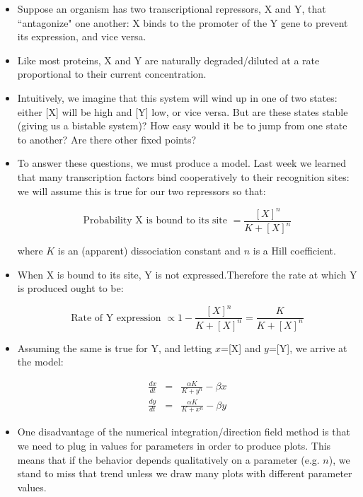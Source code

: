 \documentclass{article}
\begin{document}
\begin{itemize}

\item Suppose an organism has two transcriptional repressors, X and Y, that ``antagonize" one another: X binds to the promoter of the Y gene to prevent its expression, and vice versa.
\item Like most proteins, X and Y are naturally degraded/diluted at a rate proportional to their current concentration.
\item Intuitively, we imagine that this system will wind up in one of two states: either [X] will be high and [Y] low, or vice versa. But are these states stable (giving us a bistable system)? How easy would it be to jump from one state to another? Are there other fixed points?

\item To answer these questions, we must produce a model. Last week we learned that many transcription factors bind cooperatively to their recognition sites: we will assume this is true for our two repressors so that:

\[ \textrm{Probability X is bound to its site } = \frac{\left[ X \right]^{n}}{K + \left[ X \right]^{n}} \]

where $K$ is an (apparent) dissociation constant and $n$ is a Hill coefficient.

\item When X is bound to its site, Y is not expressed.Therefore the rate at which Y is produced ought to be:

\[ \textrm{Rate of Y expression } \propto 1 - \frac{\left[ X \right]^{n}}{K + \left[ X \right]^{n}} =  \frac{K}{K + \left[ X \right]^{n}}\]

\item Assuming the same is true for Y, and letting $x$=[X] and $y$=[Y], we arrive at the model:

\begin{eqnarray*}
\frac{dx}{dt} & = & \frac{\alpha K}{K + y^{n}} -  \beta x\\
\frac{dy}{dt} & = & \frac{\alpha K}{K + x^{n}} - \beta y
\end{eqnarray*}

\item One disadvantage of the numerical integration/direction field method is that we need to plug in values for parameters in order to produce plots. This means that if the behavior depends qualitatively on a parameter (e.g. $n$), we stand to miss that trend unless we draw many plots with different parameter values.


\end{itemize}
\end{document}
